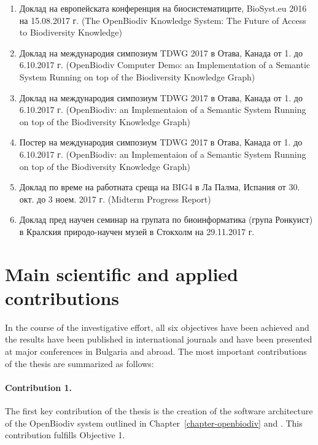 \begin{enumerate}
    \item Доклад на европейската конференция на биосистематиците, BioSyst.eu 2016 на 15.08.2017 г. (The OpenBiodiv Knowledge System: The Future of Access to Biodiversity Knowledge)
    \item Доклад на международия симпозиум TDWG 2017 в Отава, Канада от 1. до 6.10.2017 г. (OpenBiodiv Computer Demo: an Implementation of a Semantic System Running on top of the Biodiversity Knowledge Graph)
    \item Доклад на международия симпозиум TDWG 2017 в Отава, Канада от 1. до 6.10.2017 г. (OpenBiodiv: an Implementaion of a Semantic System Running on top of the Biodiversity Knowledge Graph)
    \item Постер на международия симпозиум TDWG 2017 в Отава, Канада от 1. до 6.10.2017 г. (OpenBiodiv: an Implementaion of a Semantic System Running on top of the Biodiversity Knowledge Graph)
    \item Доклад по време на работната среща на BIG4 в Ла Палма, Испания от 30. окт. до 3 ноем. 2017 г. (Midterm Progress Report)
    \item Доклад пред научен семинар на групата по биоинформатика (група Ронкуист) в Кралския природо-научен музей в Стокхолм на 29.11.2017 г.
\end{enumerate}

\section*{Main scientific and applied contributions}

In the course of the investigative effort, all six objectives have been achieved and the results have been published in international journals and have been presented at major conferences in Bulgaria and abroad. The most important contributions of the thesis are summarized as follows:

\paragraph{Contribution 1.} The first key contribution of the thesis is the creation of the software architecture of the OpenBiodiv system outlined in Chapter~\ref{chapter-openbiodiv} and \cite{senderov_open_2016}. This contribution fulfills Objective 1.

